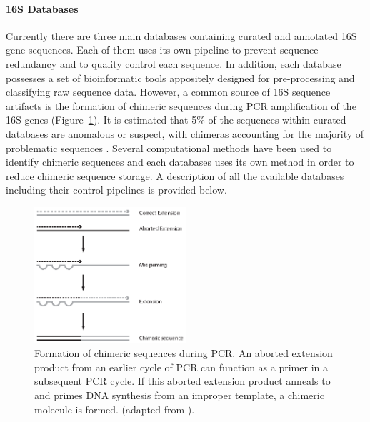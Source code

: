 \paragraph{16S Databases}
Currently there are three main databases containing curated and annotated 16S gene sequences. Each of them uses its own pipeline to prevent sequence redundancy and to quality control each sequence. In addition, each database possesses a set of bioinformatic tools appositely designed for pre-processing and classifying raw sequence data. However, a common source of 16S sequence artifacts is the formation of chimeric sequences during PCR amplification of the 16S genes (Figure~\ref{fig:chimeric}). It is estimated that 5\% of the sequences within curated databases are anomalous or suspect, with chimeras accounting for the majority of problematic sequences \cite{ashelford2005least}. Several computational methods have been used to identify chimeric sequences and each databases uses its own method in order to reduce chimeric sequence storage. A description of all the available databases including their control pipelines is provided below.\\
\begin{figure}[!tb]
	\centering
	\includegraphics[width=0.5\textwidth]{./figures/Introduction/chimeric_sequence}
  	\caption{Formation of chimeric sequences during PCR. An aborted extension product from an earlier cycle of PCR can function as a primer in a subsequent PCR cycle. If this aborted extension product anneals to and primes DNA synthesis from an improper template, a chimeric molecule is formed. (adapted from \cite{haas2011chimeric}).\label{fig:chimeric}}
\end{figure}

